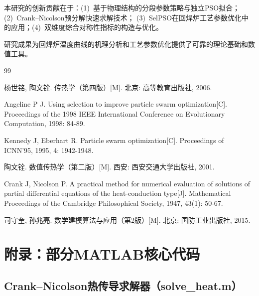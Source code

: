 \documentclass[12pt,a4paper]{ctexart}
\begin{document}
本研究的创新贡献在于：(1)~基于物理结构的分段参数策略与独立PSO拟合；(2)~Crank--Nicolson预分解快速求解技术；
(3)~SelPSO在回焊炉工艺参数优化中的应用；(4)~双维度综合对称性指标的构造与优化。

研究成果为回焊炉温度曲线的机理分析和工艺参数优化提供了可靠的理论基础和数值工具。

\newpage
\begin{thebibliography}{99}

 杨世铭, 陶文铨. 传热学（第四版）[M]. 北京: 高等教育出版社, 2006.

 Angeline P J. Using selection to improve particle swarm optimization[C]. Proceedings of the 1998 IEEE International Conference on Evolutionary Computation, 1998: 84-89.

 Kennedy J, Eberhart R. Particle swarm optimization[C]. Proceedings of ICNN'95, 1995, 4: 1942-1948.

 陶文铨. 数值传热学（第二版）[M]. 西安: 西安交通大学出版社, 2001.

 Crank J, Nicolson P. A practical method for numerical evaluation of solutions of partial differential equations of the heat-conduction type[J]. Mathematical Proceedings of the Cambridge Philosophical Society, 1947, 43(1): 50-67.

 司守奎, 孙兆亮. 数学建模算法与应用（第2版）[M]. 北京: 国防工业出版社, 2015.

\end{thebibliography}

\newpage
\section*{附录：部分MATLAB核心代码}

\subsection*{Crank--Nicolson热传导求解器（solve\_heat.m）}
\end{document}
